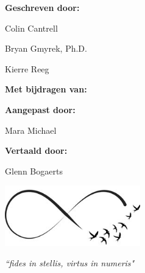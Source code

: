 \documentclass[11pt]{article}
\newcommand{\maketitlepage}[3]{%
  \begingroup
  \centering
  
  \vspace*{2\baselineskip}
  
  \textbf{Geschreven door:}\par
  \medskip
  Colin Cantrell\par
  Bryan Gmyrek, Ph.D.\par
  Kierre Reeg\par

  \vspace*{2\baselineskip}

  \textbf{Met bijdragen van:}\par
  \medskip
  \renewcommand\do[1]{%
    {
    \usevalue ##1:firstname \space \usevalue ##1:lastname \par}%
    }
  \docsvlist{#1}
  
  \vspace*{2\baselineskip}
  
  \textbf{Aangepast door:}\par
  \medskip
  Mara Michael
  
  \vspace*{2\baselineskip}

  \textbf{Vertaald door:}\par
  \medskip
  Glenn Bogaerts
  
  \vspace{30pt}
  \hspace{15pt}
  \includegraphics[width=0.44\textwidth]{./infinity.jpg}
  
  \vspace*{2\baselineskip}
  \textit{``fides in stellis, virtus in numeris"}
  
  \pagebreak
  
  \endgroup
}
\begin{document}
\title{\rmfamily{}}

\date{4 juli 2017}
    
\maketitle

\begin{abstract}


\begin{center}
R. Buckminster Fuller
\end{center}
\bigskip

Deze veranderingen worden gevoed door de noodzaak voor de verdere evolutie van de mensheid. Nu benadert de mensheid een nieuw cruciaal punt waarin we de manier van werken volledig moeten veranderen; daarom hebben we Nexus gebouwd. Peer-to-Peer-technologie is de ruggengraat van een wereldwijde op blockchain gebaseerde cryptocurrency vertegenwoordigd door de ticker: \textit{NXS} die wereldwijd wordt verhandeld als alternatieve valuta met het vermogen om te concurreren met wereldeconomie\"en. Het Nexus framework maakt gebruik van een nieuw gedistribueerd database ontwerp, wiskundige algoritmes,
gemeenschapsbestuur, op de grond gebaseerde mesh-netwerken en een \textit{Low Earth Orbit} satelliet netwerk. 
Wij zijn Nexus, een connectie van mensen,
idee\"en en computers met als doel meer vrijheid te bieden. 
Welkom in de toekomst.

   
\end{abstract}

\newpage

\tableofcontents
\newpage
\maketitlepage
  {kSmith, pSmith, jSmith}


\paragraph{\textbf{\textit{Genesis} White Paper} - \textit{1.0.4} - Laatste Revisie 28 november 2017  }

\paragraph{}
\end{document}
